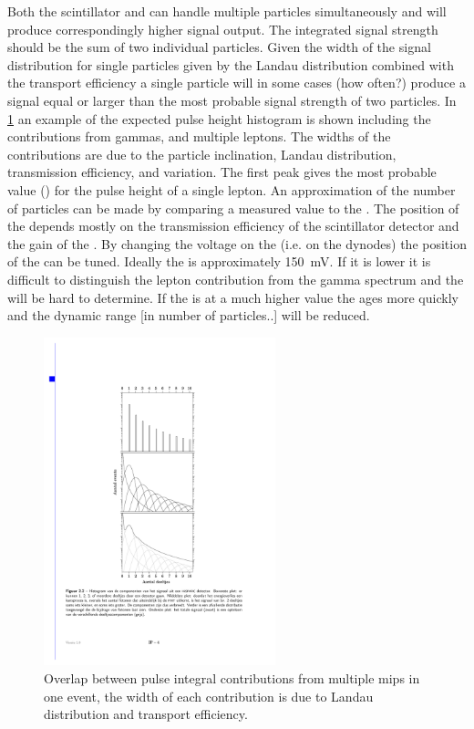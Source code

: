 Both the scintillator and \pmt can handle multiple particles simultaneously and will produce correspondingly higher signal output. The integrated signal strength should be the sum of two individual particles. Given the width of the signal distribution for single particles given by the Landau distribution combined with the transport efficiency a single particle will in some cases (how often?) produce a signal equal or larger than the most probable signal strength of two particles. In \cref{fig:ph_histogram_contrib} an example of the expected pulse height histogram is shown including the contributions from gammas, and multiple leptons. The widths of the contributions are due to the particle inclination, Landau distribution, transmission efficiency, and \pmt variation. The first peak gives the most probable value (\mpv) for the pulse height of a single lepton. An approximation of the number of particles can be made by comparing a measured value to the \mpv. The position of the \mpv depends mostly on the transmission efficiency of the scintillator detector and the gain of the \pmt. By changing the voltage on the \pmt (i.e. on the dynodes) the position of the \mpv can be tuned. Ideally the \mpv is approximately \SI{150}{\mV}. If it is lower it is difficult to distinguish the lepton contribution from the gamma spectrum and the \mpv will be hard to determine. If the \mpv is at a much higher value the \pmt ages more quickly and the dynamic range [in number of particles..] will be reduced.

\begin{figure}
    \centering
    \includegraphics[width=0.6\textwidth]
                    {plots/station/ph_histogram_contrib}
    \caption{Overlap between pulse integral contributions from multiple mips in one event, the width of each contribution is due to Landau distribution and transport efficiency.}
    \label{fig:ph_histogram_contrib}
\end{figure}


